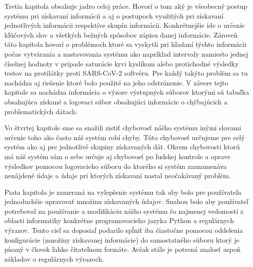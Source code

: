 Tretia kapitola obsahuje jadro celej práce. Hovorí o tom aký je všeobecný postup systému pri získavaní informácii a aj o postupoch využitých pri získavaní jednotlivých informácii respektíve skupín informácii. Konkrétnejšie ide o určenie kľúčových slov a všetkých bežných spôsobov zápisu danej informácie. Zároveň táto kapitola hovorí o problémoch ktoré sa vyskytli pri hľadaní týchto informácii počas vytvárania a nastavovania systému ako napríklad intervaly namiesto jednej číselnej hodnoty v prípade saturácie krvi kyslíkom alebo protichodné výsledky testov na protilátky proti SARS-CoV-2  softvéru. Pre každý takýto problém sa tu nachádza aj riešenie ktoré bolo použité na jeho odstránenie. V závere tejto kapitole sa nachádza informácia o výzore výstupných súborov ktorými sú tabuľka obsahujúca získané a logovací súbor obsahujúci informácie o chýbajúcich a problematických dátach. 

Vo štvrtej kapitole sme sa snažili zistiť chybovosť nášho systému inými slovami určenie toho ako často náš systém robí chyby. Túto chybovosť určujeme pre celý systém ako aj pre jednotlivé skupiny získavaných dát. Okrem chybovosti ktorú má náš systém sám o sebe určuje aj chybovosť po ľudskej kontrole a oprave výsledkov pomocou logovacieho súboru do ktorého si systém zaznamenáva nenájdené údaje a údaje pri ktorých získavaní nastal neočakávaný problém.

Piata kapitola je zameraná na vylepšenie systému tak aby bolo pre používateľa jednoduchšie upravovať množinu získavaných údajov. Snahou bolo aby používateľ potreboval na používanie a modifikáciu nášho systému čo najmenej vedomostí z oblasti informatiky konkrétne programovacieho jazyka Python a regulárnych výrazov. Tento cieľ sa doposiaľ podarilo spĺniť iba čiastočne pomocou oddelenia konfigurácie (množiny získavanej informácie) do samostatného súboru ktorý je písaný v človek ľahko čitateľnom formáte. Avšak stále je potrená znalosť aspoň základov o regulárnych výrazoch.  

